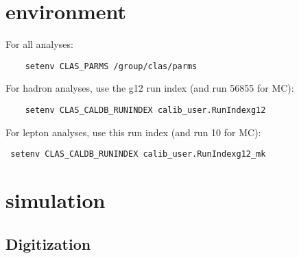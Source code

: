 \documentclass[10pt,twocolumn,oneside,letterpaper]{article}
\begin{document}
\renewcommand{\thefootnote}{\fnsymbol{footnote}}

\pagestyle{headings}


\section{environment}

\small

For all analyses:
\begin{verbatim}
    setenv CLAS_PARMS /group/clas/parms
\end{verbatim}
For hadron analyses, use the g12 run index (and run 56855 for MC):
\begin{verbatim}
    setenv CLAS_CALDB_RUNINDEX calib_user.RunIndexg12
\end{verbatim}
For lepton analyses, use this run index (and run 10 for MC):
\begin{verbatim}
 setenv CLAS_CALDB_RUNINDEX calib_user.RunIndexg12_mk
\end{verbatim}

\section{simulation}

\subsection{Digitization}
\end{document}
